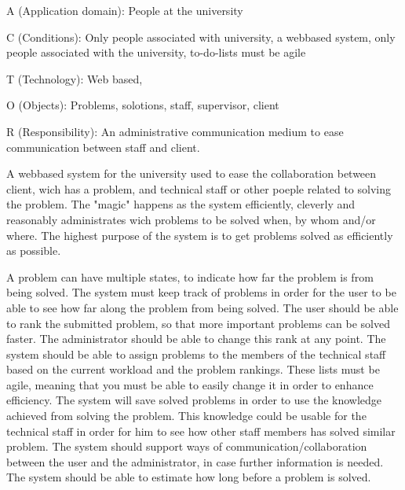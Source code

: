 A (Application domain): People at the university

C (Conditions): Only people associated with university, a webbased system, only people associated with the university, to-do-lists must be agile

T (Technology): Web based, 

O (Objects): Problems, solotions, staff, supervisor, client

R (Responsibility): An administrative communication medium to ease communication between staff and client.










A webbased system for the university used to ease the collaboration between client, wich has a problem, and technical staff or other poeple related to solving the problem. The "magic" happens as the system efficiently, cleverly and reasonably administrates wich problems to be solved when, by whom and/or where. The highest purpose of the system is to get problems solved as efficiently as possible.



A problem can have multiple states, to indicate how far the problem is from being solved.
The system must keep track of problems in order for the user to be able to see how far along the problem from being solved. The user should be able to rank the submitted problem, so that more important problems can be solved faster. The administrator should be able to change this rank at any point. 
The system should be able to assign problems to the members of the technical staff based on the current workload and the problem rankings. These lists must be agile, meaning that you must be able to easily change it in order to enhance efficiency.
The system will save solved problems in order to use the knowledge achieved from solving the problem. This knowledge could be usable for the technical staff in order for him to see how other staff members has solved similar problem. The system should support ways of communication/collaboration between the user and the administrator, in case further information is needed. The system should be able to estimate how long before a problem is solved.
